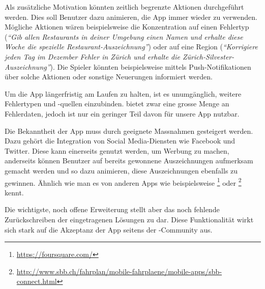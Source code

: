 Als zusätzliche Motivation könnten zeitlich begrenzte Aktionen durchgeführt werden.
Dies soll Benutzer dazu animieren, die App immer wieder zu verwenden. 
Mögliche Aktionen wären beispielsweise die Konzentration auf einen Fehlertyp (\emph{"`Gib allen Restaurants in deiner Umgebung einen Namen und erhalte diese Woche die spezielle Restaurant-Auszeichnung"'}) oder auf eine Region (\emph{"`Korrigiere jeden Tag im Dezember Fehler in Zürich und erhalte die Zürich-Silvester-Auszeichnung"'}).
Die Spieler könnten beispielsweise mittels Push-Notifikationen über solche Aktionen oder sonstige Neuerungen informiert werden.

Um die App längerfristig am Laufen zu halten, ist es unumgänglich, weitere Fehlertypen und -quellen einzubinden. 
 bietet zwar eine grosse Menge an Fehlerdaten, jedoch ist nur ein geringer Teil davon für unsere App nutzbar.

Die Bekanntheit der App muss durch geeignete Massnahmen gesteigert werden. Dazu gehört die Integration von Social Media-Diensten wie Facebook und Twitter.
Diese kann einerseits genutzt werden, um Werbung zu machen, anderseits können Benutzer auf bereits gewonnene Auszeichnungen aufmerksam gemacht werden und so dazu animieren, diese Auszeichnungen ebenfalls zu gewinnen.
Ähnlich wie man es von anderen Apps wie beispielsweise \footnote{\url{https://foursquare.com/}} oder \footnote{\url{http://www.sbb.ch/fahrplan/mobile-fahrplaene/mobile-apps/sbb-connect.html}} kennt.

Die wichtigste, noch offene Erweiterung stellt aber das noch fehlende Zurückschreiben der eingetragenen Lösungen zu  dar.
Diese Funktionalität wirkt sich stark auf die Akzeptanz der App seitens der -Community aus.